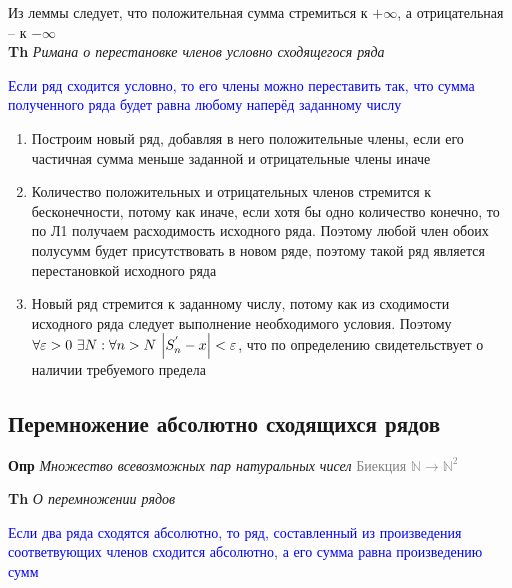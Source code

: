 Из леммы следует, что положительная сумма стремиться к $+\infty$, а отрицательная -- к $-\infty$ \\

\textbf{Th} \textit{Римана о перестановке членов условно сходящегося ряда}

\textcolor{blue}{Если ряд сходится условно, то его члены можно переставить так, что сумма полученного ряда будет
равна любому наперёд заданному числу}

\begin{enumerate}
    \item Построим новый ряд, добавляя в него положительные члены, если его частичная сумма меньше заданной и
    отрицательные члены иначе
    \item Количество положительных и отрицательных членов стремится к бесконечности, потому как иначе, если хотя
    бы одно количество конечно, то по Л1 получаем расходимость исходного ряда.
    Поэтому любой член обоих полусумм будет присутствовать в новом ряде, поэтому такой ряд является перестановкой исходного ряда
    \item Новый ряд стремится к заданному числу, потому как из сходимости исходного ряда следует выполнение
    необходимого условия.
    Поэтому $\forall \varepsilon > 0~\exists N: \forall n > N~\abs{S^{'}_n - x} < \varepsilon$,
    что по определению свидетельствует о наличии требуемого предела
\end{enumerate}

\subsection{Перемножение абсолютно сходящихся рядов}

\textbf{Опр} \textit{Множество всевозможных пар натуральных чисел} \textcolor{gray}{Биекция
    $\mathbb{N} \rightarrow \mathbb{N}^2$}

\textbf{Th} \textit{О перемножении рядов}

\textcolor{blue}{Если два ряда сходятся абсолютно, то ряд, составленный из произведения соответвующих членов
сходится абсолютно, а его сумма равна произведению сумм}

